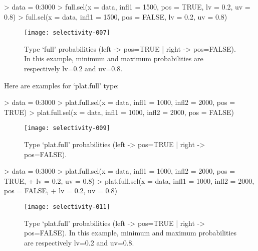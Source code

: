 \documentclass[letterpaper, 12pt]{article}
\begin{document}
\begin{Schunk}
\begin{Sinput}
> data = 0:3000
> full.sel(x = data, infl1 = 1500, pos = TRUE, lv = 0.2, uv = 0.8)
> full.sel(x = data, infl1 = 1500, pos = FALSE, lv = 0.2, uv = 0.8)
\end{Sinput}
\end{Schunk}

\begin{figure}[h]
\vspace{-20pt}
\begin{center}
\texttt{[image: selectivity-007]}
\end{center}
\vspace{-30pt}
\caption{Type `full' probabilities (left -> pos=TRUE |  right -> pos=FALSE). In this example, minimum and maximum probabilities are respectively lv=0.2 and uv=0.8.}
\vspace{-10pt}
\label{fig3}
\end{figure}

\newpage

Here are examples for `plat.full' type:
\begin{Schunk}
\begin{Sinput}
> data = 0:3000
> plat.full.sel(x = data, infl1 = 1000, infl2 = 2000, pos = TRUE)
> plat.full.sel(x = data, infl1 = 1000, infl2 = 2000, pos = FALSE)
\end{Sinput}
\end{Schunk}
\begin{figure}[h]
\vspace{-20pt}
\begin{center}
\texttt{[image: selectivity-009]}
\end{center}
\vspace{-30pt}
\caption{Type `plat.full' probabilities (left -> pos=TRUE |  right -> pos=FALSE).}
\vspace{-10pt}
\label{fig4}
\end{figure}



\begin{Schunk}
\begin{Sinput}
> data = 0:3000
> plat.full.sel(x = data, infl1 = 1000, infl2 = 2000, pos = TRUE, 
+     lv = 0.2, uv = 0.8)
> plat.full.sel(x = data, infl1 = 1000, infl2 = 2000, pos = FALSE, 
+     lv = 0.2, uv = 0.8)
\end{Sinput}
\end{Schunk}
\begin{figure}[h]
\vspace{-20pt}
\begin{center}
\texttt{[image: selectivity-011]}
\end{center}
\vspace{-30pt}
\caption{Type `plat.full' probabilities (left -> pos=TRUE |  right -> pos=FALSE). In this example, minimum and maximum probabilities are respectively lv=0.2 and uv=0.8.}
\vspace{-10pt}
\label{fig5}
\end{figure}
\end{document}
